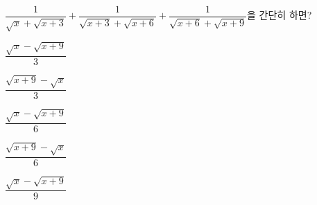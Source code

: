 \hspace*{2mm}\begin{minipage}[t]{\dimexpr\linewidth-2mm\relax}\vspace{0pt}
$\dfrac{1}{\sqrt{x}+\sqrt{x+3}}+\dfrac{1}{\sqrt{x+3}+\sqrt{x+6}}+\dfrac{1}{\sqrt{x+6}+\sqrt{x+9}}$을 간단히 하면?
\begin{choicesii}{\rule[-3ex]{0pt}{8ex}$\dfrac{\sqrt{x}-\sqrt{x+9}}{3}$}{\rule[-3ex]{0pt}{8ex}$\dfrac{\sqrt{x+9}-\sqrt{x}}{3}$}{\rule[-3ex]{0pt}{8ex}$\dfrac{\sqrt{x}-\sqrt{x+9}}{6}$}{\rule[-3ex]{0pt}{8ex}$\dfrac{\sqrt{x+9}-\sqrt{x}}{6}$}{\rule[-3ex]{0pt}{8ex}$\dfrac{\sqrt{x}-\sqrt{x+9}}{9}$}\end{choicesii}\end{minipage}
